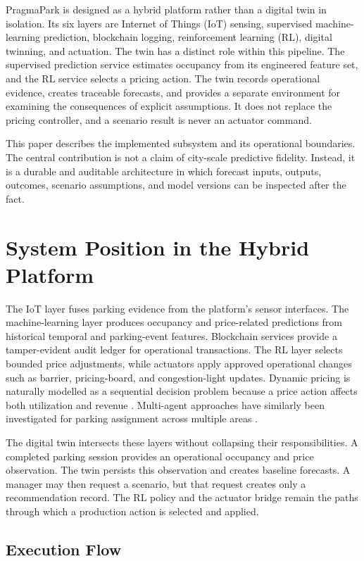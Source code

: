\documentclass[conference]{IEEEtran}
\begin{document}
PragmaPark is designed as a hybrid platform rather than a digital twin in isolation. Its six layers are Internet of Things (IoT) sensing, supervised machine-learning prediction, blockchain logging, reinforcement learning (RL), digital twinning, and actuation. The twin has a distinct role within this pipeline. The supervised prediction service estimates occupancy from its engineered feature set, and the RL service selects a pricing action. The twin records operational evidence, creates traceable forecasts, and provides a separate environment for examining the consequences of explicit assumptions. It does not replace the pricing controller, and a scenario result is never an actuator command.

This paper describes the implemented subsystem and its operational boundaries. The central contribution is not a claim of city-scale predictive fidelity. Instead, it is a durable and auditable architecture in which forecast inputs, outputs, outcomes, scenario assumptions, and model versions can be inspected after the fact.

\section{System Position in the Hybrid Platform}

The IoT layer fuses parking evidence from the platform's sensor interfaces. The machine-learning layer produces occupancy and price-related predictions from historical temporal and parking-event features. Blockchain services provide a tamper-evident audit ledger for operational transactions. The RL layer selects bounded price adjustments, while actuators apply approved operational changes such as barrier, pricing-board, and congestion-light updates. Dynamic pricing is naturally modelled as a sequential decision problem because a price action affects both utilization and revenue \cite{b11}. Multi-agent approaches have similarly been investigated for parking assignment across multiple areas \cite{b23}.

The digital twin intersects these layers without collapsing their responsibilities. A completed parking session provides an operational occupancy and price observation. The twin persists this observation and creates baseline forecasts. A manager may then request a scenario, but that request creates only a recommendation record. The RL policy and the actuator bridge remain the paths through which a production action is selected and applied.

\subsection{Execution Flow}
\end{document}
